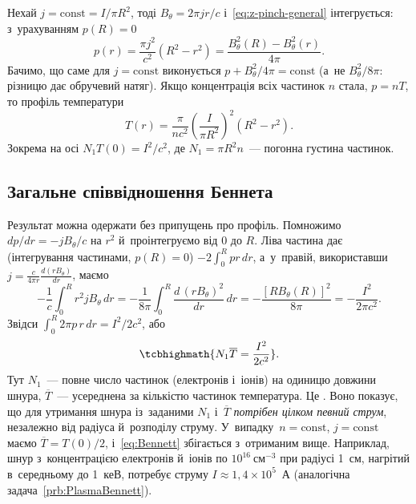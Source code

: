 Нехай $j=\mathrm{const}=I/\pi R^2$, тоді $B_\theta=2\pi jr/c$ і~\eqref{eq:z-pinch-general}
інтегрується: з~урахуванням $p(R)=0$
\begin{equation*}
	p(r)=\frac{\pi j^2}{c^2}\left(R^2-r^2\right)=\frac{B_\theta^2(R)-B_\theta^2(r)}{4\pi}.
\end{equation*}
Бачимо, що саме для $j=\mathrm{const}$ виконується $p+B_\theta^2/4\pi=\mathrm{const}$
(а~не $B_\theta^2/8\pi$: різницю дає обручевий натяг). Якщо концентрація всіх частинок $n$
стала, $p=nT$, то профіль температури
\begin{equation*}
	T(r)=\frac{\pi}{nc^2}\left(\frac I{\pi R^2}\right)^2(R^2-r^2).
\end{equation*}
Зокрема на осі $N_1T(0)=I^2/c^2$, де $N_1=\pi R^2n$~--- погонна густина
частинок.

\subsection*{Загальне співвідношення Беннета}

Результат можна одержати без припущень про профіль. Помножимо $dp/dr=-jB_\theta/c$ на
$r^2$ й~проінтегруємо від $0$ до $R$. Ліва частина дає (інтегрування частинами, $p(R)=0$)
$-2\int_0^Rpr\,dr$, а~у~правій, використавши $j=\frac c{4\pi r}\frac{d(rB_\theta)}{dr}$,
маємо
\begin{equation*}
	-\frac1c\int_0^Rr^2jB_\theta\,dr=-\frac1{8\pi}\int_0^R\frac{d\,(rB_\theta)^2}{dr}\,dr=-\frac{[RB_\theta(R)]^2}{8\pi}=-\frac{I^2}{2\pi c^2}.
\end{equation*}
Звідси $\int_0^R2\pi p\,r\,dr=I^2/2c^2$, або
\begin{equation}\label{eq:Bennett}
	\tcbhighmath{N_1\overline T=\frac{I^2}{2c^2}}.
\end{equation}
Тут $N_1$~--- повне число частинок (електронів і~іонів) на одиницю довжини шнура,
$\overline T$~--- усереднена за кількістю частинок температура. Це . Воно показує, що для утримання шнура із~заданими $N_1$ і~$\overline T$
\emph{потрібен цілком певний струм}, незалежно від радіуса й~розподілу струму.
У~випадку~$n=\mathrm{const}$, $j=\mathrm{const}$ маємо $\overline T=T(0)/2$,
і~\eqref{eq:Bennett} збігається з~отриманим вище. Наприклад, шнур з~концентрацією
електронів й~іонів по $10^{16}~\mathrm{см}^{-3}$ при радіусі 1~см, нагрітий в~середньому
до 1~кеВ, потребує струму $I\approx1{,}4\times10^5$~А (аналогічна задача~\ref{prb:PlasmaBennett}).

